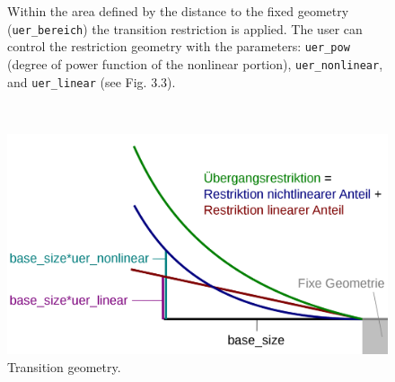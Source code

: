 \documentclass[oneside]{article}
\numberwithin{equation}{section}
\numberwithin{figure}{section}
\numberwithin{figure}{section}
\begin{document}
\begin{figure}[h]
    \centering
    \begin{minipage}[b]{5 cm}
        Within the area defined by the distance to the fixed geometry (\verb|uer_bereich|) the transition restriction is applied. The user can control the restriction geometry with the parameters: \verb|uer_pow| (degree of power function of the nonlinear portion), \verb|uer_nonlinear|, and \verb|uer_linear| (see Fig. 3.3).
        $ $\\
    \end{minipage}
    \begin{minipage}[b]{0.5 cm}
        $ $\\
    \end{minipage}
    \begin{minipage}[b]{6 cm}
        \includegraphics[scale=0.4]{uer_funk2.png}
        \caption{Transition geometry.} 
        \label{uer_model}
    \end{minipage}
\end{figure}
%
\end{document}
